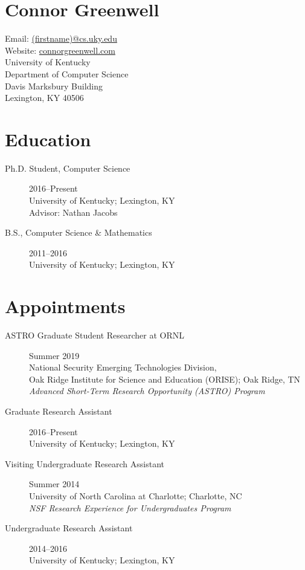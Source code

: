 \documentclass[12pt]{extarticle}
\begin{document}
\section*{\bf\huge Connor Greenwell}
Email: \href{mailto:(firstname)@cs.uky.edu}{(firstname)@cs.uky.edu} \\
Website: \href{http://connorgreenwell.com}{connorgreenwell.com} \\
University of Kentucky\\
Department of Computer Science\\
Davis Marksbury Building\\
Lexington, KY 40506

\section*{Education}

\begin{description}
    \item[Ph.D. Student, Computer Science] 2016--Present \\
        University of Kentucky; Lexington, KY \\
        Advisor: Nathan Jacobs
    \item[B.S., Computer Science \& Mathematics] 2011--2016 \\
        University of Kentucky; Lexington, KY
\end{description}

\section*{Appointments}

\begin{description}
    \item[ASTRO Graduate Student Researcher at ORNL] Summer 2019 \\
        National Security Emerging Technologies Division, \\
        Oak Ridge Institute for Science and Education (ORISE); Oak Ridge, TN \\
        \emph{Advanced Short-Term Research Opportunity (ASTRO) Program}
    \item[Graduate Research Assistant] 2016--Present \\
        University of Kentucky; Lexington, KY
    \item[Visiting Undergraduate Research Assistant] Summer 2014 \\
        University of North Carolina at Charlotte; Charlotte, NC \\
        \emph{NSF Research Experience for Undergraduates Program}
    \item[Undergraduate Research Assistant] 2014--2016 \\
        University of Kentucky; Lexington, KY 
\end{description}
\end{document}
